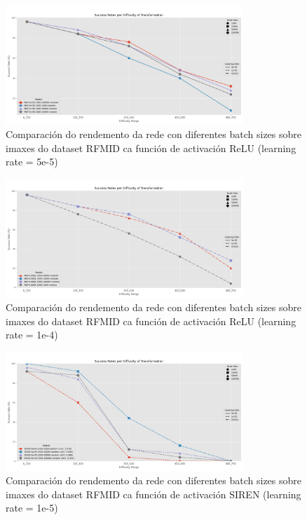 \begin{figure}[ht] 
    \centering
    \includegraphics[width=0.8\textwidth]{imaxes/batchsize/experiment_plot_RFMID_MLP_5e-05.png}
    \caption{Comparación do rendemento da rede con diferentes batch sizes sobre imaxes do dataset RFMID ca función de activación ReLU (learning rate = 5e-5)}
    \label{fig:batch_size_comparison_relu_5e-5}
\end{figure}

\begin{figure}[ht] 
    \centering
    \includegraphics[width=0.8\textwidth]{imaxes/batchsize/experiment_plot_RFMID_MLP_0.0001.png}
    \caption{Comparación do rendemento da rede con diferentes batch sizes sobre imaxes do dataset RFMID ca función de activación ReLU (learning rate = 1e-4)}
    \label{fig:batch_size_comparison_relu_1e-4}
\end{figure}

\begin{figure}[ht] 
    \centering
    \includegraphics[width=0.8\textwidth]{imaxes/batchsize/experiment_plot_RFMID_SIREN_1e-05.png}
    \caption{Comparación do rendemento da rede con diferentes batch sizes sobre imaxes do dataset RFMID ca función de activación SIREN (learning rate = 1e-5)}
    \label{fig:batch_size_comparison_siren_1e-5}
\end{figure}

